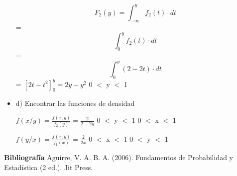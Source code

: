 \documentclass{oxmathproblems}
\begin{document}
\begin{questions}
\begin{itemize}
\begin{equation}
F_2(y) = \int _{-\infty}^{y} f_2(t)  \cdot dt
\end{equation} 
= 
\begin{equation}
 \int _{0}^{y} f_2(t)  \cdot dt
\end{equation} 
= 
\begin{equation}
 \int _{0}^{y} (2-2t)  \cdot dt
\end{equation} 
= $ [2t - t^2]_0^y = 2y - y^2 $    0 $<$ y $<$ 1 


\item  d) Encontrar las funciones de densidad 

$f(x/y) = \frac{f(x,y)}{f_2(y)} = \frac{2}{2-2y}$   0 $<$ y $<$ 1      0 $<$ x $<$ 1



$f(y/x) = \frac{f(x,y)}{f_1(x)} = \frac{2}{2x} $   0 $<$ x $<$ 1      0 $<$ y $<$ 1
\end{itemize}

\end{questions}



\textbf{Bibliografía}
Aguirre, V. A. B. A. (2006). Fundamentos de Probabilidad y Estadística (2 ed.). Jit Press.
\end{document}
